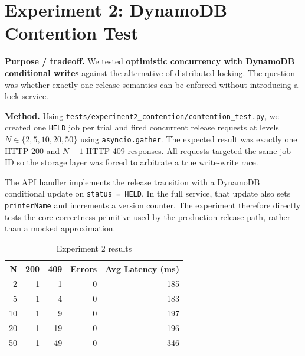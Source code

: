 \documentclass[10pt,letterpaper]{article}
\newcommand{\code}[1]{\texttt{\small #1}}
\begin{document}
\section*{Experiment 2: DynamoDB Contention Test}
\begin{claimbox}
\textbf{Purpose / tradeoff.} We tested \textbf{optimistic concurrency with DynamoDB conditional writes} against the alternative of distributed locking. The question was whether exactly-one-release semantics can be enforced without introducing a lock service.
\end{claimbox}

\textbf{Method.} Using \code{tests/experiment2\_contention/contention\_test.py}, we created one \texttt{HELD} job per trial and fired concurrent release requests at levels $N \in \{2,5,10,20,50\}$ using \code{asyncio.gather}. The expected result was exactly one HTTP 200 and $N-1$ HTTP 409 responses. All requests targeted the same job ID so the storage layer was forced to arbitrate a true write-write race.

The API handler implements the release transition with a DynamoDB conditional update on \code{status = HELD}. In the full service, that update also sets \code{printerName} and increments a version counter. The experiment therefore directly tests the core correctness primitive used by the production release path, rather than a mocked approximation.

\begin{table}[H]
\centering
\caption{Experiment 2 results}
\begin{tabular}{@{}rrrrr@{}}
\toprule
\textbf{N} & \textbf{200} & \textbf{409} & \textbf{Errors} & \textbf{Avg Latency (ms)} \\
\midrule
2  & 1 & 1  & 0 & 185 \\
5  & 1 & 4  & 0 & 183 \\
10 & 1 & 9  & 0 & 197 \\
20 & 1 & 19 & 0 & 196 \\
50 & 1 & 49 & 0 & 346 \\
\bottomrule
\end{tabular}
\end{table}
\end{document}
